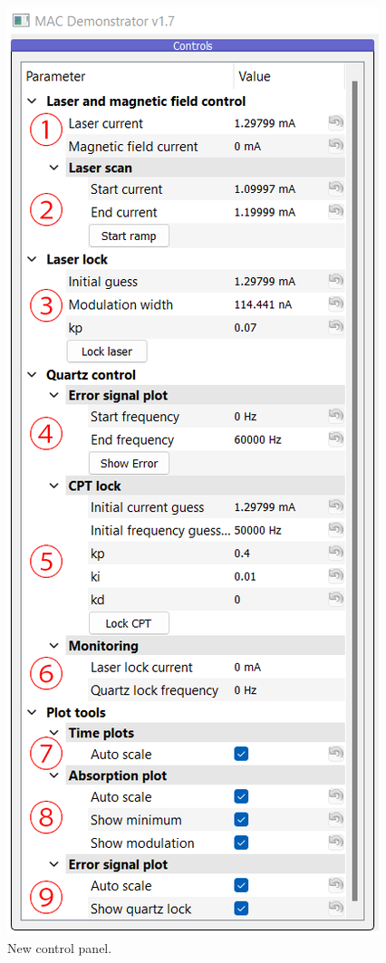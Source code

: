 \documentclass[a4paper,12pt]{article}
\begin{document}
\begingroup
\setlength{\intextsep}{0pt}%
\setlength{\columnsep}{10pt}%
\begin{figure}
    \centering\includegraphics[width=\linewidth, left]{Images/controls.png}
    \captionsetup{justification=centering}
    \caption{New control panel.}
    \label{fig:new_gui}
\end{figure}
\end{document}
